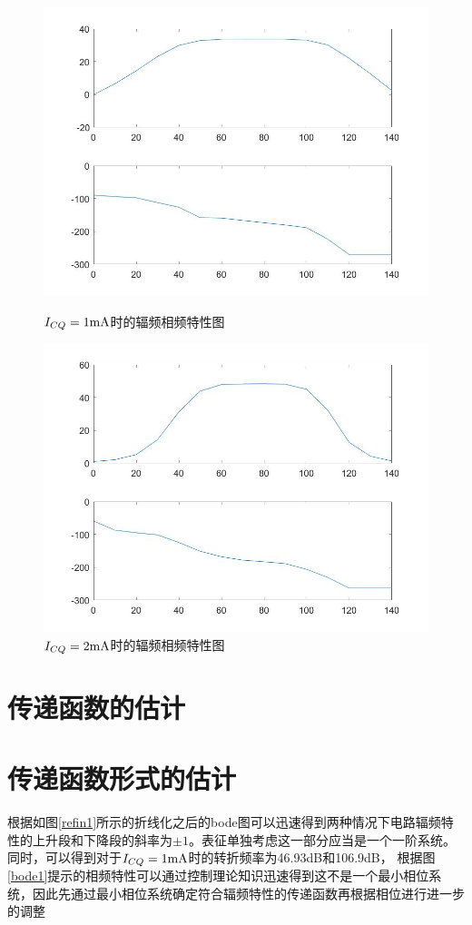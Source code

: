 \documentclass[UTF8,a4paper]{ctexart}
\begin{document}
\begin{figure}
\centering
\includegraphics[width=\textwidth]{bode1exp.jpg}
\caption{$I_{CQ}=1\rm{mA}$时的辐频相频特性图}
\label{bode1}
\includegraphics[width=\textwidth]{bode2exp.jpg}
\caption{$I_{CQ}=2\rm{mA}$时的辐频相频特性图}
\label{bode2}
\end{figure}
\section{传递函数的估计}
\section{传递函数形式的估计}
根据如图\ref{refin1}所示的折线化之后的bode图可以迅速得到两种情况下电路辐频特性的上升段和下降段的斜率为$\pm1$。表征单独考虑这一部分应当是一个一阶系统。同时，可以得到对于$I_{CQ}=1\rm{mA}$时的转折频率为46.93dB和106.9dB，
根据图\ref{bode1}提示的相频特性可以通过控制理论知识迅速得到这不是一个最小相位系统，因此先通过最小相位系统确定符合辐频特性的传递函数再根据相位进行进一步的调整
\end{document}
